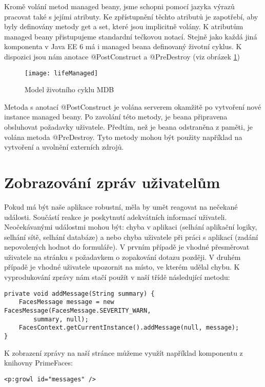\documentclass[122pt,oneside]{fithesis}
\begin{document}
Kromě volání metod managed beany, jsme schopni pomocí jazyka výrazů pracovat také s jejími atributy. Ke zpřístupnění těchto atributů je zapotřebí, aby byly definovány metody get a set, které jsou implicitně volány. K atributům managed beany přistupujeme standardní tečkovou notací. Stejně jako každá jiná komponenta v Java EE 6 má i managed beana definovaný životní cyklus. K dispozici jsou nám anotace @PostConstruct a @PreDestroy (viz obrázek \ref{img:mdb})

\begin{figure}[!ht]
\centering
\texttt{[image: lifeManaged]}
\caption{Model životního cyklu MDB}
\label{img:mdb}
\end{figure}

Metoda s anotací @PostConstruct je volána serverem okamžitě po vytvoření nové instance managed beany. Po zavolání této metody, je beana připravena obsluhovat požadavky uživatele. Předtím, než je beana odstraněna z paměti, je volána metoda @PreDestroy. Tyto metody mohou být použity například na vytvoření a uvolnění externích zdrojů.

\section{Zobrazování zpráv uživatelům}
\label{jsfMessage}
Pokud má být naše aplikace robustní, měla by umět reagovat na nečekané události. Součástí reakce je poskytnutí adekvátních informací uživateli. Neočekávanými událostmi mohou být: chyba v aplikaci (selhání aplikační logiky, selhání sítě, selhání databáze) a nebo chyba uživatele při práci s aplikací (zadání nepovolených hodnot do formuláře). V prvním případě je vhodné přesměrovat uživatele na stránku s požadavkem o zopakování dotazu později. V druhém případě je vhodné uživatele upozornit na místo, ve kterém udělal chybu. K vyprodukování zprávy nám stačí použít v naší třídě následující metodu:

\begin{lstlisting}
private void addMessage(String summary) {
	FacesMessage message = new FacesMessage(FacesMessage.SEVERITY_WARN, 
		summary, null);
	FacesContext.getCurrentInstance().addMessage(null, message);
}
\end{lstlisting}

K zobrazení zprávy na naší stránce můžeme využít například komponentu z knihovny PrimeFaces:
\begin{lstlisting}
<p:growl id="messages" />
\end{lstlisting}
\end{document}
